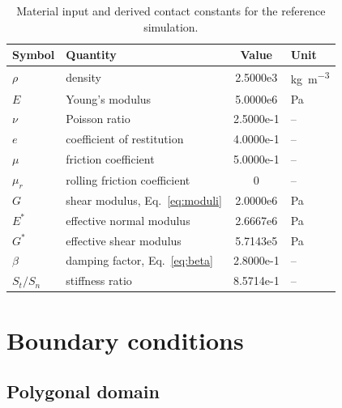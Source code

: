 \begin{table}[htbp]
  \centering
  \caption{Material input and derived contact constants for the reference
  simulation.}
  \label{tab:constants}
  \begin{tabular}{llS[table-format=1.4e2]l}
    \toprule
    Symbol & Quantity & {Value} & Unit \\
    \midrule
    $\rho$   & density                        & 2.5000e3  & \unit{\kilogram\per\cubic\metre} \\
    $E$      & Young's modulus                & 5.0000e6  & \unit{\pascal} \\
    $\nu$    & Poisson ratio                  & 2.5000e-1 & -- \\
    $e$      & coefficient of restitution     & 4.0000e-1 & -- \\
    $\mu$    & friction coefficient           & 5.0000e-1 & -- \\
    $\mu_{r}$ & rolling friction coefficient  & 0         & -- \\
    \midrule
    $G$      & shear modulus, Eq.~\eqref{eq:moduli}      & 2.0000e6 & \unit{\pascal} \\
    $E^{*}$  & effective normal modulus                  & 2.6667e6 & \unit{\pascal} \\
    $G^{*}$  & effective shear modulus                   & 5.7143e5 & \unit{\pascal} \\
    $\beta$  & damping factor, Eq.~\eqref{eq:beta}       & 2.8000e-1 & -- \\
    $S_{t}/S_{n}$ & stiffness ratio                      & 8.5714e-1 & -- \\
    \bottomrule
  \end{tabular}
\end{table}

\section{Boundary conditions}
\label{sec:walls}

\subsection{Polygonal domain}
\label{sec:domain}

